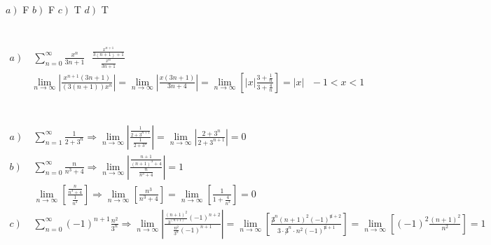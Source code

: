 \documentclass{article}
\begin{document}
\section{}
	\begin{multicols}{4}
		$\left.a\right)$ F
		\vfill\columnbreak
		$\left.b\right)$ F
		\vfill\columnbreak
		$\left.c\right)$ T
		\vfill\columnbreak
		$\left.d\right)$ T
	\end{multicols}
	
\section{}
	\begin{align*}
		\left.a\right)&\ \sum\limits_{n=0}^{\infty}{\frac{x^n}{3n+1}}\ \ \ \frac{\frac{x^{n+1}}{3\left(n+1\right)+1}}{\frac{x^n}{3n+1}}\\
		&\lim\limits_{n\rightarrow \infty}\left|\frac{x^{n+1}\left(3n+1\right)}{\left(3\left(n+1\right)\right)x^n}\right| = \lim\limits_{n\rightarrow \infty}\left|\frac{x\left(3n+1\right)}{3n+4}\right| = \lim\limits_{n\rightarrow \infty}\left[\left|x\right|\frac{3+\frac{1}{n}}{3+\frac{4}{n}}\right] = \left|x\right|\ \ \ -1<x<1
	\end{align*}
	
\section{}
	\begin{align*}
		\left.a\right)\ &\sum\limits_{n=1}^{\infty}{\frac{1}{2+3^n}}\Rightarrow\lim\limits_{n\rightarrow \infty}\left|\frac{\frac{1}{2+3^{n+1}}}{\frac{1}{2+3^n}}\right| = \lim\limits_{n\rightarrow \infty}\left|\frac{2+3^n}{2+3^{n+1}}\right| = 0\\
		\left.b\right)\ &\sum\limits_{n=0}^{\infty}{\frac{n}{n^3+4}} \Rightarrow\lim\limits_{n\rightarrow \infty}\left|\frac{\frac{n+1}{\left(n+1\right)^3+4}}{\frac{n}{n^3+4}}\right|=1\\
		&\lim\limits_{n\rightarrow \infty}\left[\frac{\frac{n}{n^3+4}}{\frac{1}{n^2}}\right]\Rightarrow \lim\limits_{n\rightarrow \infty}\left[\frac{n^3}{n^3+4}\right] = \lim\limits_{n\rightarrow \infty}\left[\frac{1}{1+\frac{4}{n^3}}\right]= 0\\
		\left.c\right)\ &\sum\limits_{n=0}^{\infty}{\left(-1\right)^{n+1}\frac{n^2}{3^n}}\Rightarrow \lim\limits_{n\rightarrow \infty}\left|\frac{\frac{\left(n+1\right)^2}{3^{\left(n+1\right)}}\left(-1\right)^{n+2} }{\frac{n^2}{3^n}\left(-1\right)^{n+1}}\right| = \lim\limits_{n\rightarrow \infty}\left[\frac{\not 3^{n} \left(n+1\right)^2 \left(-1\right)^{\not n +2}}{3\cdot \not 3^{n} \cdot n^2 \left(-1\right)^{\not n +1}}\right] = \lim\limits_{n\rightarrow \infty}\left[\left(-1\right)^2\frac{\left(n+1\right)^2}{n^2}\right] = 1
	\end{align*}
	
\end{document}
